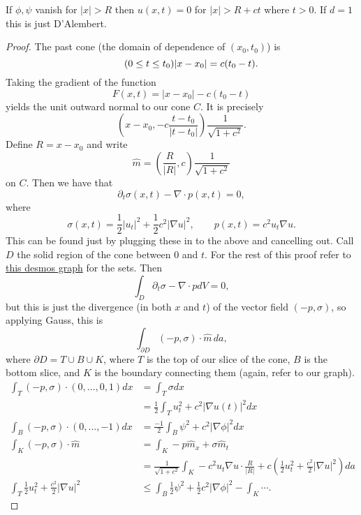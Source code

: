 \begin{theorem}
	If \( \phi, \psi \) vanish for \( |x| > R \) then \( u(x, t) = 0 \) for \( |x| > R + ct \) where \( t > 0 \). If \( d = 1 \) this is just D'Alembert.
\end{theorem}
\begin{proof}
	The past cone (the domain of dependence of \( (x_{0}, t_{0}) \)) is
	\[\tag{\( 0 \le t \le t_{0} \)} |x - x_{0}| = c(t_{0} - t). \]
	Taking the gradient of the function
	\[ F(x, t) = |x - x_{0}| - c(t_{0} - t) \]
	yields the unit outward normal to our cone \( C \). It is  precisely
	\[ \left( x - x_{0}, -c \frac{t - t_{0}}{|t - t_{0}|} \right) \frac{1}{\sqrt{1 + c^{2}}}. \]
	Define \( R = x - x_{0} \) and write 
	\[ \hat m = \left( \frac{R}{|R|}, c \right) \frac{1}{\sqrt{1+c^{2}}} \]
	on \( C \). Then we have that
	\[ \partial_{t} \sigma(x, t) - \nabla \cdot p(x, t) = 0, \]
	where
	\[ \sigma(x, t) = \frac{1}{2}|u_{t}|^{2} + \frac{1}{2}c^{2} | \nabla u|^{2}, \qquad p(x, t) = c^{2} u_{t} \nabla u. \]
	This can be found just by plugging these in to the above and cancelling out. Call \( D \) the solid region of the cone between \( 0 \) and \( t \). For the rest of this proof refer to \href{https://www.desmos.com/3d/njaziiud1o}{this desmos graph} for the sets. Then
	\[ \int_{D} \partial_{t} \sigma - \nabla \cdot p dV = 0, \]
	but this is just the divergence (in both \( x \) and \( t \)) of the vector field \( (-p, \sigma) \), so applying Gauss, this is
	\[ \int_{\partial D} (-p, \sigma) \cdot \hat m\, da, \]
	where \( \partial D = T \cup B \cup K \), where \( T \) is the top of our slice of the cone, \( B \) is the bottom slice, and \( K \) is the boundary connecting them (again, refer to our graph).
	\begin{align*}
		\int_{T} (-p, \sigma) \cdot (0, \ldots, 0, 1) dx &= \int_{T} \sigma dx \\
		&= \frac{1}{2} \int_{T} u^{2}_{t} + c^{2} | \nabla u(t)|^{2} dx\\
		\tag{\( * \)}\int_{B} (-p, \sigma) \cdot (0, \ldots, -1) dx &= \frac{-1}{2} \int_{B} \psi^{2} + c^{2} | \nabla \phi|^{2} dx \\
		\int_{K} (-p, \sigma) \cdot \hat m &= \int_{K} -p \hat m_{x} + \sigma \hat m_{t} \\
																			 &= \frac{1}{\sqrt{1 + c^{2}}} \int_{K}  - c^{2} u_{t} \nabla u \cdot \frac{R}{|R|} + c \left(\frac{1}{2} u_{t}^{2} + \frac{c^{2}}{2} | \nabla u|^{2}\right) d a \\
		\int_{T} \frac{1}{2} u_{t}^{2} + \frac{c^{2}}{2} | \nabla u|^{2} & \le \int_{B}  \frac{1}{2} \psi^{2} + \frac{1}{2} c^{2} | \nabla \phi|^{2} - \int_{K} \cdots.

\end{align*}
\end{proof}
